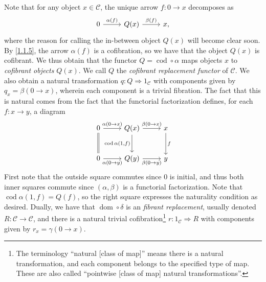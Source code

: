 \begin{remark}\label{1.1.16}
	Note that for any object $x\in \mathcal{C} $, the unique arrow $f:0\to x$ decomposes as
	\[\begin{tikzcd}[row sep = 2.5em, column sep = 2.5em]
	0 \ar[" \alpha(f) ", r]  & Q(x)\ar[" \beta(f) ", r]  & x,
	\end{tikzcd}\]
	where the reason for calling the in-between object $Q(x)$ will become clear soon. By \cref{1.1.5}, the arrow $\alpha(f)$ is a cofibration, so we have that the object $Q(x)$ is cofibrant. We thus obtain that the functor $Q=\operatorname{cod} \circ \alpha$ maps objects $x$ to \emph{cofibrant objects} $Q(x)$. We call $Q$ the \emph{cofibrant replacement functor} of $\mathcal{C} $. We also obtain a natural transformation $q : Q \Rightarrow 1_\mathcal{C} $ with components given by $q_x = \beta(0\to x)$, wherein each component is a trivial fibration. The fact that this is natural comes from the fact that the functorial factorization defines, for each $f : x \to y$, a diagram
	\[\begin{tikzcd}[row sep = 2.5em, column sep = 2.5em]
	0 \ar[equals, d] \ar[" \alpha(0\to x) ", r]  & Q(x)\ar[" \beta(0\to x) ", r] \ar[" \operatorname{cod} \alpha(1\text{,} f) "', d]  & x \ar[" f ", d]  \\
	0 \ar[" \alpha(0\to y) "', r]  & Q(y) \ar[" \beta(0\to y) "', r]  & y
	\end{tikzcd}\]
	First note that the outside square commutes since $0$ is initial, and thus both inner squares commute since $(\alpha,\beta)$ is a functorial factorization. Note that $\operatorname{cod} \alpha(1,f)=Q(f)$, so the right square expresses the naturality condition as desired. Dually, we have that $\operatorname{dom} \circ \delta$ is an \emph{fibrant replacement}, usually denoted $R : \mathcal{C}  \to \mathcal{C} $, and there is a natural trivial cofibration\footnote{The terminology ``natural [class of map]'' means there is a natural transformation, and each component belongs to the specified type of map. These are also called ``pointwise [class of map] natural transformations''.} $r : 1_\mathcal{C}  \Rightarrow R$ with components given by $r_x = \gamma(0\to x)$.
\end{remark}

